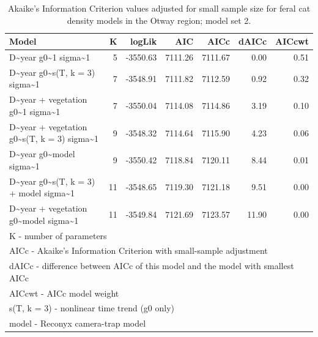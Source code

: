\documentclass[preprint, 3p, authoryear]{elsarticle} %
\begin{document}
\newpage

\begingroup\fontsize{10}{12}\selectfont

\begin{longtable}[t]{lrrrrrr}
\caption{\label{tab:density-aic-o-2}Akaike's Information Criterion values adjusted for small sample size for feral cat density models in the Otway region; model set 2.}\\
\toprule
Model & K & logLik & AIC & AICc & dAICc & AICcwt\\
\midrule
D\textasciitilde{}year g0\textasciitilde{}1 sigma\textasciitilde{}1 & 5 & -3550.63 & 7111.26 & 7111.67 & 0.00 & 0.51\\
D\textasciitilde{}year g0\textasciitilde{}s(T, k = 3) sigma\textasciitilde{}1 & 7 & -3548.91 & 7111.82 & 7112.59 & 0.92 & 0.32\\
D\textasciitilde{}year + vegetation g0\textasciitilde{}1 sigma\textasciitilde{}1 & 7 & -3550.04 & 7114.08 & 7114.86 & 3.19 & 0.10\\
D\textasciitilde{}year + vegetation g0\textasciitilde{}s(T, k = 3) sigma\textasciitilde{}1 & 9 & -3548.32 & 7114.64 & 7115.90 & 4.23 & 0.06\\
D\textasciitilde{}year g0\textasciitilde{}model sigma\textasciitilde{}1 & 9 & -3550.42 & 7118.84 & 7120.11 & 8.44 & 0.01\\
\addlinespace
D\textasciitilde{}year g0\textasciitilde{}s(T, k = 3) + model sigma\textasciitilde{}1 & 11 & -3548.65 & 7119.30 & 7121.18 & 9.51 & 0.00\\
D\textasciitilde{}year + vegetation g0\textasciitilde{}model sigma\textasciitilde{}1 & 11 & -3549.84 & 7121.69 & 7123.57 & 11.90 & 0.00\\
\bottomrule
\multicolumn{7}{l}{\rule{0pt}{1em}K - number of parameters}\\
\multicolumn{7}{l}{\rule{0pt}{1em}AICc - Akaike's Information Criterion with small-sample adjustment}\\
\multicolumn{7}{l}{\rule{0pt}{1em}dAICc - difference between AICc of this model and the model with smallest AICc}\\
\multicolumn{7}{l}{\rule{0pt}{1em}AICcwt - AICc model weight}\\
\multicolumn{7}{l}{\rule{0pt}{1em}s(T, k = 3) - nonlinear time trend (g0 only)}\\
\multicolumn{7}{l}{\rule{0pt}{1em}model - Reconyx camera-trap model}\\
\end{longtable}
\endgroup{}

\newpage
\end{document}
